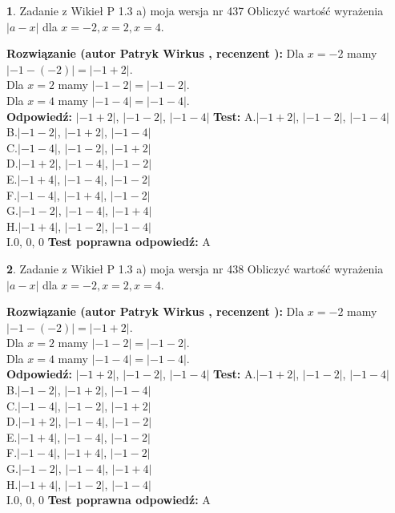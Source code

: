 \documentclass[12pt, a4paper]{article}
\theoremstyle{definition} %
\newtheorem{zad}{}
\newcommand{\zadStart}[1]{\begin{zad}#1\newline}
\newcommand{\zadStop}{\end{zad}}
\newcommand{\rozwStart}[2]{\noindent \textbf{Rozwiązanie (autor #1 , recenzent #2): }\newline}
\newcommand{\rozwStop}{\newline}
\newcommand{\odpStart}{\noindent \textbf{Odpowiedź:}\newline}
\newcommand{\odpStop}{\newline}
\newcommand{\testStart}{\noindent \textbf{Test:}\newline}
\newcommand{\testStop}{\newline}
\newcommand{\kluczStart}{\noindent \textbf{Test poprawna odpowiedź:}\newline}
\newcommand{\kluczStop}{\newline}
\begin{document}
\zadStart{Zadanie z Wikieł P 1.3 a) moja wersja nr 437}
Obliczyć wartość wyrażenia $|a - x|$ dla $x=-2,x=2,x=4$.
\zadStop
\rozwStart{Patryk Wirkus}{}
Dla $x = -2$ mamy $|-1 - (-2)| = |-1 + 2|$.\\
Dla $x = 2$ mamy $|-1 - 2| = |-1 - 2|$.\\
Dla $x = 4$ mamy $|-1 - 4| = |-1 - 4|$.\\
\rozwStop
\odpStart
$|-1 + 2|$, $|-1 - 2|$, $|-1 - 4|$
\odpStop
\testStart
A.$|-1 + 2|$, $|-1 - 2|$, $|-1 - 4|$\\
B.$|-1 - 2|$, $|-1 + 2|$, $|-1 - 4|$\\
C.$|-1 - 4|$, $|-1 - 2|$, $|-1 + 2|$\\
D.$|-1 + 2|$, $|-1 - 4|$, $|-1 - 2|$\\
E.$|-1 + 4|$, $|-1 - 4|$, $|-1 - 2|$\\
F.$|-1 - 4|$, $|-1 + 4|$, $|-1 - 2|$\\
G.$|-1 - 2|$, $|-1 - 4|$, $|-1 + 4|$\\
H.$|-1 + 4|$, $|-1 - 2|$, $|-1 - 4|$\\
I.$0$, $0$, $0$
\testStop
\kluczStart
A
\kluczStop



\zadStart{Zadanie z Wikieł P 1.3 a) moja wersja nr 438}
Obliczyć wartość wyrażenia $|a - x|$ dla $x=-2,x=2,x=4$.
\zadStop
\rozwStart{Patryk Wirkus}{}
Dla $x = -2$ mamy $|-1 - (-2)| = |-1 + 2|$.\\
Dla $x = 2$ mamy $|-1 - 2| = |-1 - 2|$.\\
Dla $x = 4$ mamy $|-1 - 4| = |-1 - 4|$.\\
\rozwStop
\odpStart
$|-1 + 2|$, $|-1 - 2|$, $|-1 - 4|$
\odpStop
\testStart
A.$|-1 + 2|$, $|-1 - 2|$, $|-1 - 4|$\\
B.$|-1 - 2|$, $|-1 + 2|$, $|-1 - 4|$\\
C.$|-1 - 4|$, $|-1 - 2|$, $|-1 + 2|$\\
D.$|-1 + 2|$, $|-1 - 4|$, $|-1 - 2|$\\
E.$|-1 + 4|$, $|-1 - 4|$, $|-1 - 2|$\\
F.$|-1 - 4|$, $|-1 + 4|$, $|-1 - 2|$\\
G.$|-1 - 2|$, $|-1 - 4|$, $|-1 + 4|$\\
H.$|-1 + 4|$, $|-1 - 2|$, $|-1 - 4|$\\
I.$0$, $0$, $0$
\testStop
\kluczStart
A
\kluczStop
\end{document}
